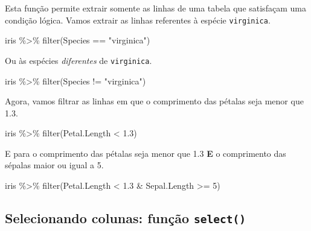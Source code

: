 \documentclass[
]{book}
\newenvironment{Shaded}{\begin{snugshade}}{\end{snugshade}}
\newcommand{\DecValTok}[1]{\textcolor[rgb]{0.00,0.00,0.81}{#1}}
\newcommand{\FloatTok}[1]{\textcolor[rgb]{0.00,0.00,0.81}{#1}}
\newcommand{\FunctionTok}[1]{\textcolor[rgb]{0.00,0.00,0.00}{#1}}
\newcommand{\NormalTok}[1]{#1}
\newcommand{\SpecialCharTok}[1]{\textcolor[rgb]{0.00,0.00,0.00}{#1}}
\newcommand{\StringTok}[1]{\textcolor[rgb]{0.31,0.60,0.02}{#1}}
\begin{document}
Esta função permite extrair somente as linhas de uma tabela que satisfaçam uma condição lógica. Vamos extrair as linhas referentes à espécie \texttt{virginica}.

\begin{Shaded}
\begin{Highlighting}[]
\NormalTok{iris }\SpecialCharTok{\%\textgreater{}\%} 
  \FunctionTok{filter}\NormalTok{(Species }\SpecialCharTok{==} \StringTok{"virginica"}\NormalTok{)}
\end{Highlighting}
\end{Shaded}

Ou às espécies \emph{diferentes} de \texttt{virginica}.

\begin{Shaded}
\begin{Highlighting}[]
\NormalTok{iris }\SpecialCharTok{\%\textgreater{}\%} 
  \FunctionTok{filter}\NormalTok{(Species }\SpecialCharTok{!=} \StringTok{"virginica"}\NormalTok{)}
\end{Highlighting}
\end{Shaded}

Agora, vamos filtrar as linhas em que o comprimento das pétalas seja menor que 1.3.

\begin{Shaded}
\begin{Highlighting}[]
\NormalTok{iris }\SpecialCharTok{\%\textgreater{}\%} 
  \FunctionTok{filter}\NormalTok{(Petal.Length }\SpecialCharTok{\textless{}} \FloatTok{1.3}\NormalTok{)}
\end{Highlighting}
\end{Shaded}

E para o comprimento das pétalas seja menor que 1.3 \textbf{E} o comprimento das sépalas maior ou igual a 5.

\begin{Shaded}
\begin{Highlighting}[]
\NormalTok{iris }\SpecialCharTok{\%\textgreater{}\%} 
  \FunctionTok{filter}\NormalTok{(Petal.Length }\SpecialCharTok{\textless{}} \FloatTok{1.3} \SpecialCharTok{\&}\NormalTok{ Sepal.Length }\SpecialCharTok{\textgreater{}=} \DecValTok{5}\NormalTok{)}
\end{Highlighting}
\end{Shaded}

\hypertarget{selecionando-colunas-funuxe7uxe3o-select}{%
\subsection{\texorpdfstring{Selecionando colunas: função \texttt{select()}}{Selecionando colunas: função select()}}\label{selecionando-colunas-funuxe7uxe3o-select}}
\end{document}
